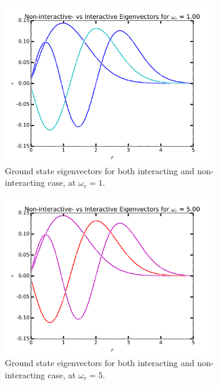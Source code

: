 \documentclass[11pt,a4paper,notitlepage]{article}
\begin{document}
\begin{figure}[H]
	\begin{subfigure}[b]{0.45\textwidth}
		\includegraphics[scale=0.40]{../interacting_eigvecs_at_omega=1000.png}
		\caption{Ground state eigenvectors for both interacting and non-interacting case, at $\omega_r = 1$.}\label{fig:eigvecs-interact1000}
	\end{subfigure}
	\hfill
	\begin{subfigure}[b]{0.45\textwidth}
		\includegraphics[scale=0.40]{../interacting_eigvecs_at_omega=5000.png}
		\caption{Ground state eigenvectors for both interacting and non-interacting case, at $\omega_r = 5$.}\label{fig:eigvecs-interact5000}
	\end{subfigure}
	\begin{subfigure}[t]{0.45\textwidth}

\end{subfigure}
\end{figure}
\end{document}
